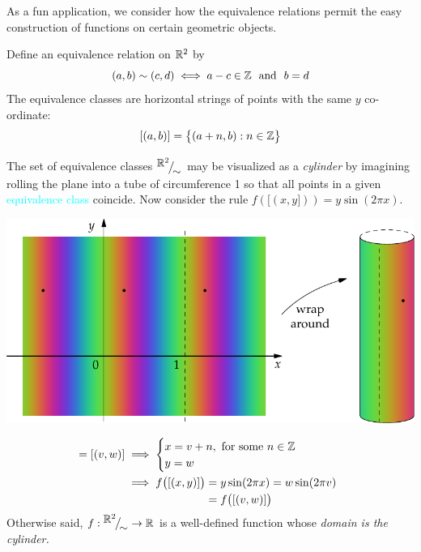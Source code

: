 
As a fun application, we consider how the equivalence relations permit the easy construction of functions on certain geometric objects.

\begin{examples}{}{}
	\exstart Define an equivalence relation on $\mathbb{R}^2$ by
	\[
		(a,b)\sim (c,d)\iff a-c\in\Z \ \text{ and }\ b=d
	\]
	The equivalence classes are horizontal strings of points with the same $y$ co-ordinate:
	\[
		[(a,b)]=\bigl\{(a+n,b):n\in\mathbb{Z}\bigr\}
	\]
	\begin{enumerate}\setcounter{enumi}{1}
	  \begin{minipage}[t]{0.53\linewidth}\vspace{-17pt}
			\item[]The set of equivalence classes ${}^{\textstyle {\mathbb{R}^2}}\!\big/_{\textstyle \!{\sim}}$ may be visualized as a \emph{cylinder} by imagining rolling the plane into a tube of circumference 1 so that all points in a given \textcolor{cyan}{equivalence class} coincide.\footnotemark\smallbreak
			Now consider the rule $f([(x,y]))=y\sin(2\pi x)$. %
		\end{minipage}
		\hfill
		\begin{minipage}[t]{0.45\linewidth}\vspace{-50pt}
			\hfill\includegraphics[scale=0.85]{relations-13-cylinder}
		\end{minipage}
		\par\vspace{-19pt}
		\begin{align*}
	  	[(x,y)]=[(v,w)]
	  	&\implies
	  	\begin{cases}
				x=v+n,\text{ for some $n\in\Z$}\\
				y=w
			\end{cases}\\
	  	&
	  	\begin{array}{@{}r@{}l}
	  		{}\implies f\bigl([(x,y)]\bigr)&{}=y\sin(2\pi x) =w\sin(2\pi v)\\[3pt]
	  		&{}=f\bigl([(v,w)]\bigr)
	  	\end{array}
	  \end{align*}
	  Otherwise said, $f:\smash{{}^{\textstyle {\mathbb{R}^2}}\!\big/_{\textstyle \!{\sim}}}\to\mathbb{R}$ is a well-defined function whose \emph{domain is the cylinder.}
	   

\end{enumerate}
\end{examples}
